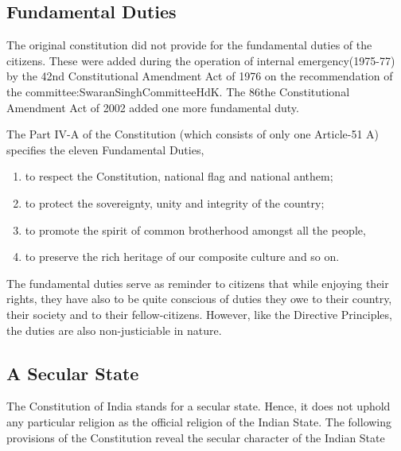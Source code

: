 \subsection{Fundamental Duties}

The original constitution did not provide for the fundamental duties of the citizens. These were added during the operation of internal emergency(1975-77) by the 42nd Constitutional Amendment Act of 1976 on the recommendation of the \gls{committee:SwaranSinghCommitteeHdK}. The 86the Constitutional Amendment Act of 2002 added one more fundamental duty.

The Part IV-A of the Constitution (which consists of only one Article-51 A) specifies the eleven Fundamental Duties,

\renewcommand{\labelenumi}{\textbf{(\alph{enumi})}}
\begin{enumerate}
  \item to respect the Constitution, national flag and national anthem;
  \item to protect the sovereignty, unity and integrity of the country;
  \item to promote the spirit of common brotherhood amongst all the people,
  \item to preserve the rich heritage of our composite culture and so on.
\end{enumerate}

The fundamental duties serve as reminder to citizens that while enjoying their rights, they have also to be quite conscious of duties they owe to their country, their society and to their fellow-citizens. However, like the Directive Principles, the duties are also non-justiciable in nature.


\subsection{A Secular State}

The Constitution of India stands for a secular state. Hence, it does not uphold any particular religion as the official religion of the Indian State. The following provisions of the Constitution reveal the secular character of the Indian State

